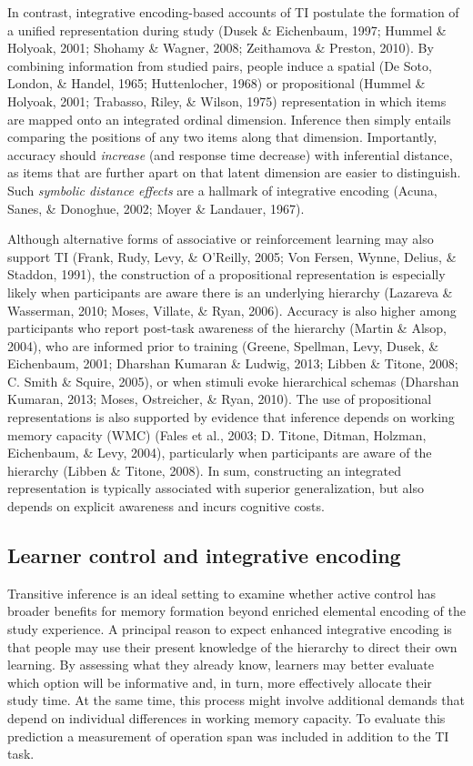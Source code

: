 \documentclass[floatsintext,man]{apa6}
\theoremstyle{definition}
\theoremstyle{definition}
\theoremstyle{definition}
\theoremstyle{remark}
\begin{document}
In contrast, integrative encoding-based accounts of TI postulate the
formation of a unified representation during study (Dusek \& Eichenbaum,
1997; Hummel \& Holyoak, 2001; Shohamy \& Wagner, 2008; Zeithamova \&
Preston, 2010). By combining information from studied pairs, people
induce a spatial (De Soto, London, \& Handel, 1965; Huttenlocher, 1968)
or propositional (Hummel \& Holyoak, 2001; Trabasso, Riley, \& Wilson,
1975) representation in which items are mapped onto an integrated
ordinal dimension. Inference then simply entails comparing the positions
of any two items along that dimension. Importantly, accuracy should
\emph{increase} (and response time decrease) with inferential distance,
as items that are further apart on that latent dimension are easier to
distinguish. Such \emph{symbolic distance effects} are a hallmark of
integrative encoding (Acuna, Sanes, \& Donoghue, 2002; Moyer \&
Landauer, 1967).

Although alternative forms of associative or reinforcement learning may
also support TI (Frank, Rudy, Levy, \& O'Reilly, 2005; Von Fersen,
Wynne, Delius, \& Staddon, 1991), the construction of a propositional
representation is especially likely when participants are aware there is
an underlying hierarchy (Lazareva \& Wasserman, 2010; Moses, Villate, \&
Ryan, 2006). Accuracy is also higher among participants who report
post-task awareness of the hierarchy (Martin \& Alsop, 2004), who are
informed prior to training (Greene, Spellman, Levy, Dusek, \&
Eichenbaum, 2001; Dharshan Kumaran \& Ludwig, 2013; Libben \& Titone,
2008; C. Smith \& Squire, 2005), or when stimuli evoke hierarchical
schemas (Dharshan Kumaran, 2013; Moses, Ostreicher, \& Ryan, 2010). The
use of propositional representations is also supported by evidence that
inference depends on working memory capacity (WMC) (Fales et al., 2003;
D. Titone, Ditman, Holzman, Eichenbaum, \& Levy, 2004), particularly
when participants are aware of the hierarchy (Libben \& Titone, 2008).
In sum, constructing an integrated representation is typically
associated with superior generalization, but also depends on explicit
awareness and incurs cognitive costs.

\subsection{Learner control and integrative
encoding}\label{learner-control-and-integrative-encoding}

Transitive inference is an ideal setting to examine whether active
control has broader benefits for memory formation beyond enriched
elemental encoding of the study experience. A principal reason to expect
enhanced integrative encoding is that people may use their present
knowledge of the hierarchy to direct their own learning. By assessing
what they already know, learners may better evaluate which option will
be informative and, in turn, more effectively allocate their study time.
At the same time, this process might involve additional demands that
depend on individual differences in working memory capacity. To evaluate
this prediction a measurement of operation span was included in addition
to the TI task.
\end{document}
